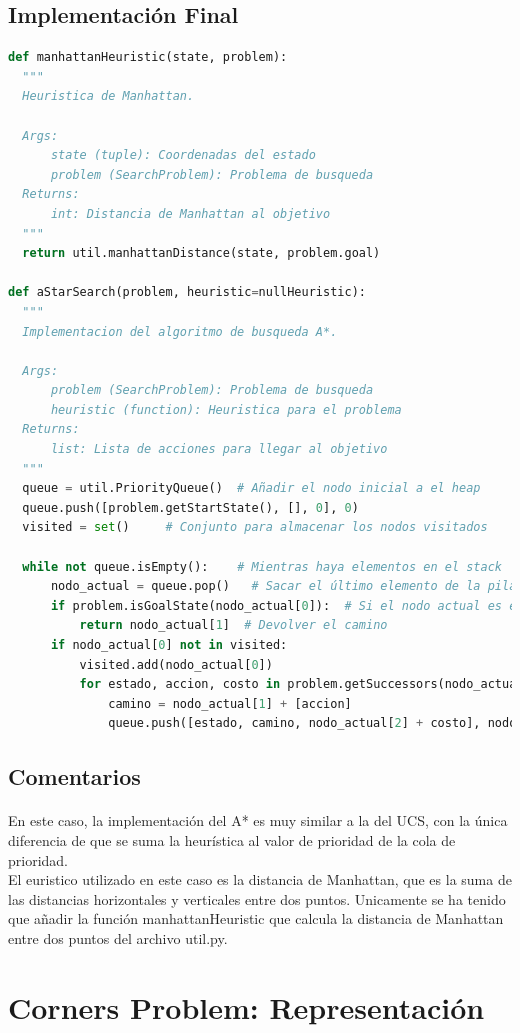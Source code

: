 \documentclass{report}
\begin{document}
        \subsection*{Implementación Final}
          \begin{lstlisting}[language=Python, caption=Implementación final del A*]
def manhattanHeuristic(state, problem):
  """
  Heuristica de Manhattan.
  
  Args:
      state (tuple): Coordenadas del estado
      problem (SearchProblem): Problema de busqueda
  Returns:
      int: Distancia de Manhattan al objetivo
  """
  return util.manhattanDistance(state, problem.goal)

def aStarSearch(problem, heuristic=nullHeuristic):
  """
  Implementacion del algoritmo de busqueda A*.

  Args:
      problem (SearchProblem): Problema de busqueda
      heuristic (function): Heuristica para el problema
  Returns:
      list: Lista de acciones para llegar al objetivo
  """
  queue = util.PriorityQueue()  # Añadir el nodo inicial a el heap
  queue.push([problem.getStartState(), [], 0], 0)
  visited = set()     # Conjunto para almacenar los nodos visitados

  while not queue.isEmpty():    # Mientras haya elementos en el stack
      nodo_actual = queue.pop()   # Sacar el último elemento de la pila
      if problem.isGoalState(nodo_actual[0]):  # Si el nodo actual es el objetivo
          return nodo_actual[1]  # Devolver el camino
      if nodo_actual[0] not in visited:
          visited.add(nodo_actual[0])
          for estado, accion, costo in problem.getSuccessors(nodo_actual[0]): # Añadir los hijos del nodo actual a la pila
              camino = nodo_actual[1] + [accion]
              queue.push([estado, camino, nodo_actual[2] + costo], nodo_actual[2] + costo + heuristic(estado, problem))        
          \end{lstlisting}
        \subsection*{Comentarios}
          \paragraph*{}{
            En este caso, la implementación del A* es muy similar a la del UCS, con la única diferencia de que se suma la heurística al valor de prioridad de la cola de prioridad.\\
            El euristico utilizado en este caso es la distancia de Manhattan, que es la suma de las distancias horizontales y verticales entre dos puntos. Unicamente se ha tenido que añadir la función manhattanHeuristic que calcula la distancia de Manhattan entre dos puntos del archivo util.py.\\
          }
      \clearpage\section{Corners Problem: Representación}
\end{document}
